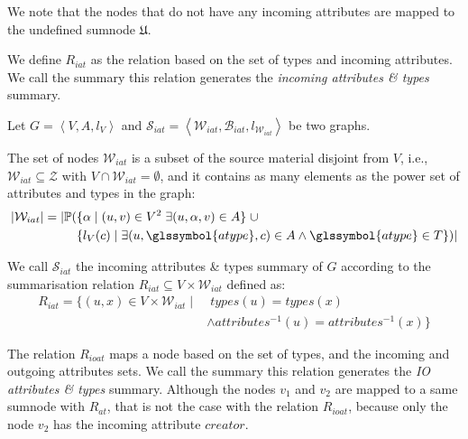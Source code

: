 \begin{remark}
We note that the nodes that do not have any incoming attributes are mapped to the undefined sumnode $\mathfrak{U}$.
\end{remark}

\vspace{.5cm}


We define $R_{iat}$ as the relation based on the set of types and incoming attributes. We call the summary this relation generates the \emph{incoming attributes \& types} summary.

\begin{definition}
	Let $G=\left\langle V, A, l_V \right\rangle$ and $\mathcal{S}_{iat} = \left\langle \mathcal{W}_{iat}, \mathcal{B}_{iat}, l_{\mathcal{W}_{iat}} \right\rangle$ be two graphs.

	The set of nodes $\mathcal{W}_{iat}$ is a subset of the source material disjoint from $V$, i.e., $\mathcal{W}_{iat} \subseteq \mathcal{Z}$ with $V \cap \mathcal{W}_{iat} = \emptyset$, and it contains as many elements as the power set of attributes and types in the graph:
	$$
	\begin{aligned}
	\lvert \mathcal{W}_{iat} \rvert = \lvert \mathbb{P} ( & \{ \alpha \mid (u, v) \in V^2\; \exists (u, \alpha, v) \in A \} \;\cup \\
	& \{ l_V(c) \mid \exists (u, \glssymbol{atype}, c) \in A \wedge \glssymbol{atype} \in T \} ) \rvert
	\end{aligned}
	$$

	We call $\mathcal{S}_{iat}$ the incoming attributes \& types summary of $G$ according to the summarisation relation $R_{iat} \subseteq V \times \mathcal{W}_{iat}$ defined as:
	$$
	\begin{aligned}
	R_{iat} = \{ (u, x) \in V \times \mathcal{W}_{iat} \mid &\; types(u) = types(x) \\
	& \wedge attributes^{-1}(u) = attributes^{-1}(x) \}
	\end{aligned}
	$$
	\label{def:iat}
\end{definition}
\vspace{.5cm}


The relation $R_{ioat}$ maps a node based on the set of types, and the incoming and outgoing attributes sets. We call the summary this relation generates the \emph{IO attributes \& types} summary.
Although the nodes $v_1$ and $v_2$ are mapped to a same sumnode with $R_{at}$, that is not the case with the relation $R_{ioat}$, because only the node $v_2$ has the incoming attribute $creator$.

